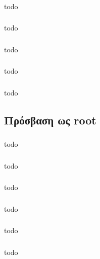 \documentclass[a4paper, 12pt]{article}
\begin{document}
		\subsubsection{}
			todo

		\subsubsection{}
			todo

		\subsubsection{}
			todo

		\subsubsection{}
			todo

		\subsubsection{}
			todo


	\subsection{Πρόσβαση ως root}

		\subsubsection{}
			todo

		\subsubsection{}
			todo

		\subsubsection{}
			todo

		\subsubsection{}
			todo

		\subsubsection{}
			todo

		\subsubsection{}
			todo
\end{document}
